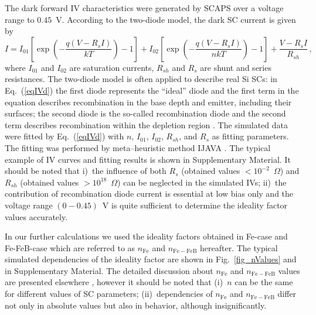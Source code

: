 \documentclass[num-refs]{wiley-article} %
\begin{document}
The dark forward IV characteristics were generated by SCAPS over a voltage range to $0.45$~V.
According to the two-diode model, the dark SC current is given by \citep{Breitenstein2013}
\begin{equation}
\label{eqIVd}
    I=I_{01}\left[\exp\left(-\frac{q(V-R_sI)}{kT}\right)-1\right]
      + I_{02}\left[\exp\left(-\frac{q(V-R_sI)}{nkT}\right)-1\right]
      +\frac{V-R_sI}{R_{sh}}\,,
\end{equation}
where
$I_{01}$ and $I_{02}$ are saturation currents,
$R_{sh}$ and $R_s$ are shunt and series resistances.
The two-diode model is often applied to describe real Si SCs:
in Eq.~(\ref{eqIVd}) the first diode represents the ``ideal'' diode
and the first term in the equation describes recombination
in the base depth and emitter, including their surfaces;
the second diode is the so-called recombination diode
and the second term describes recombination within the depletion region \citep{Breitenstein2013}.
The simulated data were fitted by Eq.~(\ref{eqIVd})
with $n$, $I_{01}$, $I_{02}$,
$R_{sh}$, and $R_s$ as fitting parameters.
The fitting was performed by meta--heuristic method IJAVA \cite{IJAVA}.
The typical example of IV curves and fitting results is shown
in Supplementary Material.
It should be noted that
i)~the influence of both $R_s$ (obtained values $<10^{-2}$~$\Omega$) and $R_{sh}$
(obtained values $>10^{18}$~$\Omega$) can be neglected in the simulated IVs;
ii)~the contribution of recombination diode current is essential at low bias only
and the voltage range $(0-0.45)$~V is quite sufficient
to determine the ideality factor values accurately.

In our further calculations we used the ideality factors
obtained in  Fe-case and Fe-FeB-case
which are referred to as  $n_\mathrm{Fe}$ and $n_\mathrm{Fe-FeB}$ hereafter.
The typical simulated dependencies of  the ideality factor are shown in Fig.~\ref{fig_nValues}
and in Supplementary Material.
The detailed discussion about $n_\mathrm{Fe}$ and $n_\mathrm{Fe-FeB}$ values are presented elsewhere \cite{OlikhJPS},
however it should be noted that
(i)~$n$ can be the same for different  values of SC parameters;
(ii)~dependencies of $n_\mathrm{Fe}$ and $n_\mathrm{Fe-FeB}$ differ not only in absolute values but also in behavior, although insignificantly.
\end{document}
